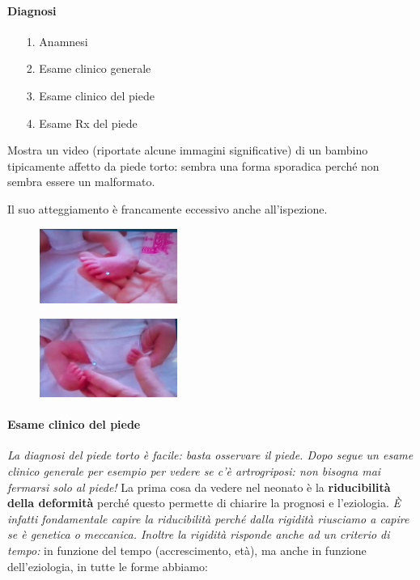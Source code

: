 \paragraph{Diagnosi}

\begin{itemize}
\item[1.]
  Anamnesi
\item[2.]
  Esame clinico generale
\item[3.]
  Esame clinico del piede
\item[4.]
  Esame Rx del piede
\end{itemize}

Mostra un video (riportate alcune immagini significative) di un bambino tipicamente affetto da piede torto: sembra una forma sporadica perché non sembra essere un malformato.

Il suo atteggiamento è francamente eccessivo anche all'ispezione.

\begin{figure}[!ht]
\centering
\includegraphics[width=0.4\textwidth]{016/image11.png}
\end{figure}

\begin{figure}[!ht]
\centering
\includegraphics[width=0.4\textwidth]{016/image12.png}
\end{figure}

\paragraph{Esame clinico del piede}

\emph{La diagnosi del piede torto è facile: basta osservare il piede.
Dopo segue un esame clinico generale per esempio per vedere se c'è artrogriposi: non bisogna mai fermarsi solo al piede!} La prima cosa da vedere nel neonato è la \textbf{riducibilità della deformità} perché questo permette di chiarire la prognosi e l'eziologia. \emph{È infatti fondamentale capire la riducibilità perché dalla rigidità riusciamo a capire se è genetica o meccanica. Inoltre la rigidità risponde anche ad un criterio di tempo:} in funzione del tempo (accrescimento, età), ma
anche in funzione dell'eziologia, in tutte le forme abbiamo:

